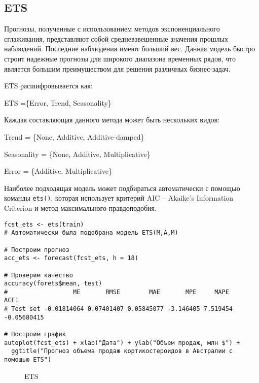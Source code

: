 \documentclass[a4paper,12pt]{article}
\theoremstyle{plain} %
\theoremstyle{definition} %
\theoremstyle{remark} %
\begin{document}
\subsection{ETS}

Прогнозы, полученные с использованием методов экспоненциального сглаживания, представляют собой средневзвешенные значения прошлых наблюдений.
Последние наблюдения имеют больший вес.
Данная модель быстро строит надежные прогнозы для широкого диапазона временных рядов, что является большим преимуществом для решения различных бизнес-задач.

\vspace{2ex}
ETS расшифровывается как:
\begin{center}
ETS =\{Error, Trend, Seasonality\}

\vspace{2ex}

Каждая составляющая данного метода может быть нескольких видов:

Trend = \{None, Additive, Additive-damped\}
\vspace{2ex}

Seasonality = \{None, Additive, Multiplicative\}
\vspace{2ex}

Error = \{Additive, Multiplicative\}
\end{center}

Наиболее подходящая модель может подбираться автоматически с помощью команды \verb|ets()|, которая использует критерий AIC -- Akaike's Information Criterion и метод максимального правдоподобия.

\begin{verbatim}
fcst_ets <- ets(train)
# Автоматически была подобрана модель ETS(M,A,M)

# Построим прогноз
acc_ets <- forecast(fcst_ets, h = 18)

# Проверим качество
accuracy(forets$mean, test)
#                  ME       RMSE        MAE       MPE     MAPE        ACF1
# Test set -0.01814064 0.07401407 0.05845077 -3.146405 7.519454 -0.05680415

# Построим график
autoplot(fcst_ets) + xlab("Дата") + ylab("Объем продаж, млн $") +
  ggtitle("Прогноз объема продаж кортикостероидов в Австралии с помощью ETS")
\end{verbatim}

\begin{figure}[H]
  \noindent{}
  \caption{ETS}
\end{figure}
\end{document}
